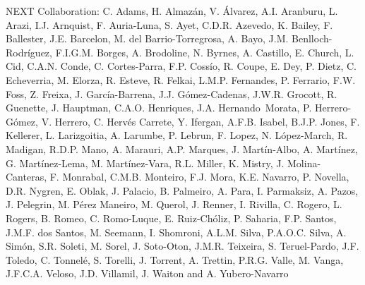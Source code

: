 NEXT Collaboration: C. Adams, H. Almaz\'an, V. \'Alvarez, A.I. Aranburu, L. Arazi, I.J. Arnquist, F. Auria-Luna, S. Ayet, C.D.R. Azevedo, K. Bailey, F. Ballester, J.E. Barcelon, M. del Barrio-Torregrosa, A. Bayo, J.M. Benlloch-Rodr\'{i}guez, F.I.G.M. Borges, A. Brodoline, N. Byrnes, A. Castillo, E. Church, L. Cid, C.A.N. Conde, C. Cortes-Parra, F.P. Coss\'io, R. Coupe, E. Dey, P. Dietz, C. Echeverria, M. Elorza, R. Esteve, R. Felkai, L.M.P. Fernandes, P. Ferrario, F.W. Foss, Z. Freixa, J. Garc\'ia-Barrena, J.J. G\'omez-Cadenas, J.W.R. Grocott, R. Guenette, J. Hauptman, C.A.O. Henriques, J.A. Hernando~Morata, P. Herrero-G\'omez, V. Herrero, C. Herv\'es Carrete, Y. Ifergan, A.F.B. Isabel, B.J.P. Jones, F. Kellerer, L. Larizgoitia, A. Larumbe, P. Lebrun, F. Lopez, N. L\'opez-March, R. Madigan, R.D.P. Mano, A. Marauri, A.P. Marques, J. Mart\'in-Albo, A. Mart\'inez, G. Mart\'inez-Lema, M. Mart\'inez-Vara, R.L. Miller, K. Mistry, J. Molina-Canteras, F. Monrabal, C.M.B. Monteiro, F.J. Mora, K.E. Navarro, P. Novella, D.R. Nygren, E. Oblak, J. Palacio, B. Palmeiro, A. Para, I. Parmaksiz, A. Pazos, J. Pelegrin, M. P\'erez Maneiro, M. Querol, J. Renner, I. Rivilla, C. Rogero, L. Rogers, B. Romeo, C. Romo-Luque, E. Ruiz-Ch\'oliz, P. Saharia, F.P. Santos, J.M.F. dos Santos, M. Seemann, I. Shomroni, A.L.M. Silva, P.A.O.C. Silva, A. Sim\'on, S.R. Soleti, M. Sorel, J. Soto-Oton, J.M.R. Teixeira, S. Teruel-Pardo, J.F. Toledo, C. Tonnel\'e, S. Torelli, J. Torrent, A. Trettin, P.R.G. Valle, M. Vanga, J.F.C.A. Veloso, J.D. Villamil, J. Waiton and A. Yubero-Navarro
